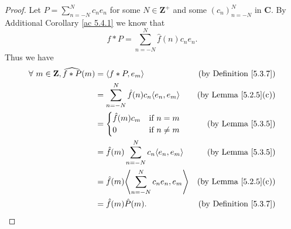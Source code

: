 \begin{proof}
    Let \(P = \sum_{n = -N}^N c_n e_n\) for some \(N \in \mathbf{Z}^+\) and some \((c_n)_{n = -N}^N\) in \(\mathbf{C}\).
    By Additional Corollary \ref{ac 5.4.1} we know that
    \[
        f * P = \sum_{n = -N}^N \hat{f}(n) c_n e_n.
    \]
    Thus we have
    \begin{align*}
        \forall\ m \in \mathbf{Z}, \widehat{f * P}(m) & = \inner{f * P, e_m}                               & \text{(by Definition \ref{5.3.7})} \\
                                                      & = \sum_{n = -N}^N \hat{f}(n) c_n \inner{e_n, e_m}  & \text{(by Lemma \ref{5.2.5}(c))}   \\
                                                      & = \begin{cases}
            \hat{f}(m) c_m & \text{if } n = m    \\
            0              & \text{if } n \neq m
        \end{cases}                       & \text{(by Lemma \ref{5.3.5})}      \\
                                                      & = \hat{f}(m) \sum_{n = -N}^N c_n \inner*{e_n, e_m} & \text{(by Lemma \ref{5.3.5})}      \\
                                                      & = \hat{f}(m) \inner*{\sum_{n = -N}^N c_n e_n, e_m} & \text{(by Lemma \ref{5.2.5}(c))}   \\
                                                      & = \hat{f}(m) \hat{P}(m).                           & \text{(by Definition \ref{5.3.7})}
    \end{align*}


\end{proof}
